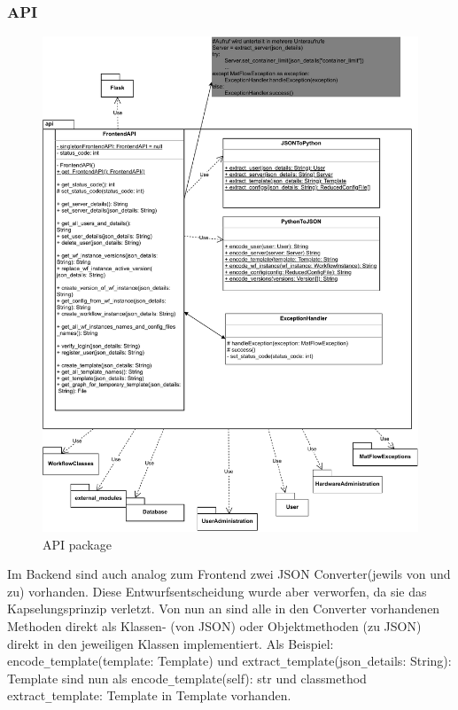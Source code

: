     \subsubsection{API} \label{json_backend}
        \begin{figure}[H]
            \label{API}
            \centerline{\includegraphics[scale=0.5]{res/api.drawio.pdf}}
            \caption{API package}
        \end{figure}
        \vspace{0.3in}
        Im Backend sind auch analog zum Frontend zwei JSON Converter(jewils von und zu) vorhanden.
        Diese Entwurfsentscheidung wurde aber verworfen, da sie das Kapselungsprinzip verletzt.
        Von nun an sind alle in den Converter vorhandenen Methoden direkt als Klassen- (von JSON)
        oder Objektmethoden (zu JSON) direkt in den jeweiligen Klassen implementiert. Als Beispiel: 
        encode\texttt{\_}template(template: Template) und extract\texttt{\_}template(json\texttt{\_}details: String): Template
        sind nun als encode\texttt{\_}template(self): str und \texttt{\@}classmethod extract\texttt{\_}template: Template 
        in Template vorhanden.    


